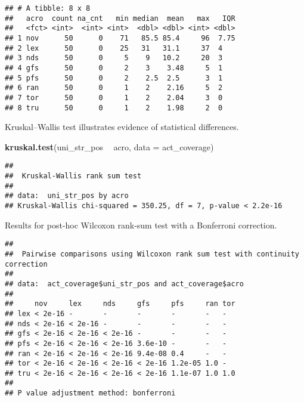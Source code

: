 \documentclass[]{book}
\newenvironment{Shaded}{\begin{snugshade}}{\end{snugshade}}
\newcommand{\DataTypeTok}[1]{\textcolor[rgb]{0.13,0.29,0.53}{#1}}
\newcommand{\KeywordTok}[1]{\textcolor[rgb]{0.13,0.29,0.53}{\textbf{#1}}}
\newcommand{\NormalTok}[1]{#1}
\newcommand{\OperatorTok}[1]{\textcolor[rgb]{0.81,0.36,0.00}{\textbf{#1}}}
\newcommand{\OtherTok}[1]{\textcolor[rgb]{0.56,0.35,0.01}{#1}}
\newcommand{\StringTok}[1]{\textcolor[rgb]{0.31,0.60,0.02}{#1}}
\begin{document}
\begin{verbatim}
## # A tibble: 8 x 8
##   acro  count na_cnt   min median  mean   max   IQR
##   <fct> <int>  <int> <int>  <dbl> <dbl> <int> <dbl>
## 1 nov      50      0    71   85.5 85.4     96  7.75
## 2 lex      50      0    25   31   31.1     37  4   
## 3 nds      50      0     5    9   10.2     20  3   
## 4 gfs      50      0     2    3    3.48     5  1   
## 5 pfs      50      0     2    2.5  2.5      3  1   
## 6 ran      50      0     1    2    2.16     5  2   
## 7 tor      50      0     1    2    2.04     3  0   
## 8 tru      50      0     1    2    1.98     2  0
\end{verbatim}

Kruskal--Wallis test illustrates evidence of statistical differences.

\begin{Shaded}
\begin{Highlighting}[]
\KeywordTok{kruskal.test}\NormalTok{(uni_str_pos }\OperatorTok{~}\StringTok{ }\NormalTok{acro, }\DataTypeTok{data =}\NormalTok{ act_coverage)}
\end{Highlighting}
\end{Shaded}

\begin{verbatim}
## 
##  Kruskal-Wallis rank sum test
## 
## data:  uni_str_pos by acro
## Kruskal-Wallis chi-squared = 350.25, df = 7, p-value < 2.2e-16
\end{verbatim}

Results for post-hoc Wilcoxon rank-sum test with a Bonferroni correction.

\begin{Shaded}
\end{Shaded}

\begin{verbatim}
## 
##  Pairwise comparisons using Wilcoxon rank sum test with continuity correction 
## 
## data:  act_coverage$uni_str_pos and act_coverage$acro 
## 
##     nov     lex     nds     gfs     pfs     ran tor
## lex < 2e-16 -       -       -       -       -   -  
## nds < 2e-16 < 2e-16 -       -       -       -   -  
## gfs < 2e-16 < 2e-16 < 2e-16 -       -       -   -  
## pfs < 2e-16 < 2e-16 < 2e-16 3.6e-10 -       -   -  
## ran < 2e-16 < 2e-16 < 2e-16 9.4e-08 0.4     -   -  
## tor < 2e-16 < 2e-16 < 2e-16 < 2e-16 1.2e-05 1.0 -  
## tru < 2e-16 < 2e-16 < 2e-16 < 2e-16 1.1e-07 1.0 1.0
## 
## P value adjustment method: bonferroni
\end{verbatim}
\end{document}
